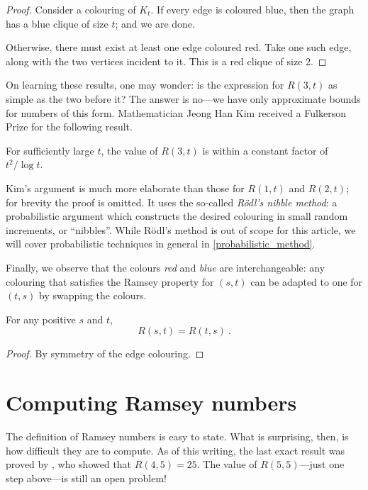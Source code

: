 \documentclass{article}
\begin{document}
\begin{proof}
    Consider a colouring of $K_t$. If every edge is coloured blue, then the graph has a blue clique of size $t$; and we are done.

    Otherwise, there must exist at least one edge coloured red. Take one such edge, along with the two vertices incident to it. This is a red clique of size 2.
\end{proof}

On learning these results, one may wonder: is the expression for $R(3,t)$ as simple as the two before it? The answer is no---we have only approximate bounds for numbers of this form. Mathematician Jeong Han Kim received a Fulkerson Prize for the following result.

\begin{Theorem} \label{kims_theorem}
    For sufficiently large $t$, the value of $R(3,t)$ is within a constant factor of $t^2/\log t$.
\end{Theorem}

Kim's argument is much more elaborate than those for $R(1,t)$ and $R(2,t)$; for brevity the proof is omitted. It uses the so-called \textit{R\"{o}dl's nibble method}: a probabilistic argument which constructs the desired colouring in small random increments, or ``nibbles''. While R\"{o}dl's method is out of scope for this article, we will cover probabilistic techniques in general in \cref{probabilistic_method}.

Finally, we observe that the colours \emph{red} and \emph{blue} are interchangeable: any colouring that satisfies the Ramsey property for $(s,t)$ can be adapted to one for $(t,s)$ by swapping the colours.

\begin{Proposition}
    For any positive $s$ and $t$,
    \[ R(s,t) = R(t,s) \ . \]
\end{Proposition}

\begin{proof}
    By symmetry of the edge colouring.
\end{proof}

\section{Computing Ramsey numbers}

The definition of Ramsey numbers is easy to state. What is surprising, then, is how difficult they are to compute. As of this writing, the last exact result was proved by \cite{JGT:JGT3190190304}, who showed that $R(4,5) = 25$. The value of $R(5,5)$---just one step above---is still an open problem!
\end{document}
